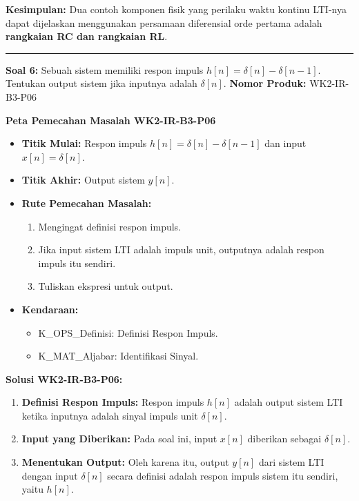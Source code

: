 \documentclass[
  letterpaper,
  DIV=11,
  numbers=noendperiod]{scrreprt}
\providecommand{\tightlist}{%
  \setlength{\itemsep}{0pt}\setlength{\parskip}{0pt}}
\begin{document}
\textbf{Kesimpulan:} Dua contoh komponen fisik yang perilaku waktu
kontinu LTI-nya dapat dijelaskan menggunakan persamaan diferensial orde
pertama adalah \textbf{rangkaian RC dan rangkaian RL}.

\begin{center}\rule{0.5\linewidth}{0.5pt}\end{center}

\textbf{Soal 6:} Sebuah sistem memiliki respon impuls
\(h[n] = \delta[n] - \delta[n-1]\). Tentukan output sistem jika inputnya
adalah \(\delta[n]\). \textbf{Nomor Produk:} WK2-IR-B3-P06

\textbf{Peta Pemecahan Masalah WK2-IR-B3-P06}

\begin{itemize}
\tightlist
\item
  \textbf{Titik Mulai:} Respon impuls \(h[n] = \delta[n] - \delta[n-1]\)
  dan input \(x[n] = \delta[n]\).
\item
  \textbf{Titik Akhir:} Output sistem \(y[n]\).
\item
  \textbf{Rute Pemecahan Masalah:}

  \begin{enumerate}
  \def\labelenumi{\arabic{enumi}.}
  \tightlist
  \item
    Mengingat definisi respon impuls.
  \item
    Jika input sistem LTI adalah impuls unit, outputnya adalah respon
    impuls itu sendiri.
  \item
    Tuliskan ekspresi untuk output.
  \end{enumerate}
\item
  \textbf{Kendaraan:}

  \begin{itemize}
  \tightlist
  \item
    K\_OPS\_Definisi: Definisi Respon Impuls.
  \item
    K\_MAT\_Aljabar: Identifikasi Sinyal.
  \end{itemize}
\end{itemize}

\textbf{Solusi WK2-IR-B3-P06:}

\begin{enumerate}
\def\labelenumi{\arabic{enumi}.}
\tightlist
\item
  \textbf{Definisi Respon Impuls:} Respon impuls \(h[n]\) adalah output
  sistem LTI ketika inputnya adalah sinyal impuls unit \(\delta[n]\).
\item
  \textbf{Input yang Diberikan:} Pada soal ini, input \(x[n]\) diberikan
  sebagai \(\delta[n]\).
\item
  \textbf{Menentukan Output:} Oleh karena itu, output \(y[n]\) dari
  sistem LTI dengan input \(\delta[n]\) secara definisi adalah respon
  impuls sistem itu sendiri, yaitu \(h[n]\).
\end{enumerate}
\end{document}
